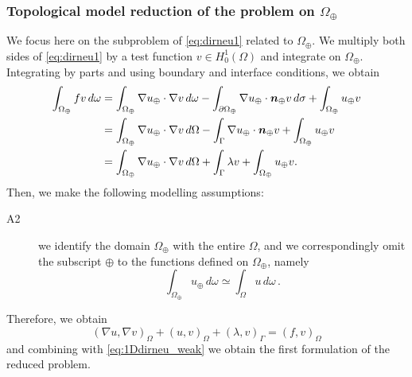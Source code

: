 \documentclass[r]{siamart171218}
\begin{document}
\subsubsection*{Topological model reduction of the problem on $\Omega_{\oplus}$}
We focus here on the subproblem of \eqref{eq:dirneu1} related to $\Omega_{\oplus}$.
We multiply both sides of \eqref{eq:dirneu1} by a test function $v\in H^1_0(\Omega)$ and integrate on $\Omega_\oplus$. Integrating by parts and using boundary and interface conditions, we obtain
\begin{equation*}
\begin{split}
\int_{\Omega _{\oplus}}fv\,d\omega&=
\int _{\Omega _{\oplus}}\nabla u_{\oplus} \cdot\nabla v\,d\omega -\int _{\partial \Omega _{\oplus}}\nabla u_{\oplus} \cdot \boldsymbol n_{\oplus} v\,d\sigma + \int_{\Omega_{\oplus}} u_{\oplus} v
\\
&=\int _{\Omega _{\oplus}}\nabla u_{\oplus} \cdot\nabla v\,d\Omega -\int_{\Gamma} \nabla u_{\oplus} \cdot \boldsymbol n_{\oplus} v + \int_{\Omega_{\oplus}} u_{\oplus} v
\\
&=\int _{\Omega _{\oplus}}\nabla u_{\oplus} \cdot\nabla v\,d\Omega +\int_{\Gamma} \lambda v + \int_{\Omega_{\oplus}} u_{\oplus} v.
\end{split}
\end{equation*} 
Then, we make the following modelling assumptions:
\begin{description}
\item[A2] we identify the domain $\Omega_{\oplus}$ with the entire $\Omega$, 
and we correspondingly omit the subscript $\oplus$ to the functions defined on $\Omega_{\oplus}$,
namely
\begin{equation*}
\int_{\Omega_{\oplus}} u_\oplus\, d\omega \simeq \int_{\Omega} u\, d\omega\,.
\end{equation*}
\end{description}
Therefore, we obtain 
\begin{equation*}
(\nabla u ,\nabla v)_{\Omega} +(u,v)_{\Omega}+(\lambda, v)_{\Gamma}  =(f,v)_{\Omega}
\end{equation*}
and combining with \eqref{eq:1Ddirneu_weak} we obtain the first formulation of the reduced problem.
\end{document}
